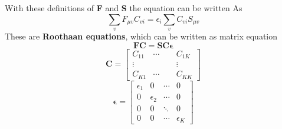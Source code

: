 \documentclass[11pt]{article}
\begin{document}
With these definitions of \textbf{F} and \textbf{S} the equation can be written As
\begin{equation}
    \sum_{v}F_{\mu v}C_{v i}=\epsilon_i\sum_{v}C_{vi}S_{\mu v}
\end{equation}
These are \textbf{Roothaan equations}, which can be written as matrix equation
\begin{equation}
    \mathbf{FC}=\mathbf{SC\epsilon}    
\end{equation}
\begin{equation}
    \mathbf{C}=
    \begin{bmatrix}
        C_{11}&\cdots& C_{1K}\\
        \vdots&\qquad& \vdots\\
        C_{K1}&\cdots& C_{KK}
    \end{bmatrix}
\end{equation}
\begin{equation}
    \mathbf{\epsilon}=
        \begin{bmatrix}
            \epsilon_1&0&\cdots&0\\
            0&\epsilon_2&\cdots&0\\
            0&0&\ddots&0\\
            0&0&\cdots&\epsilon_K
        \end{bmatrix}
\end{equation}
\end{document}
